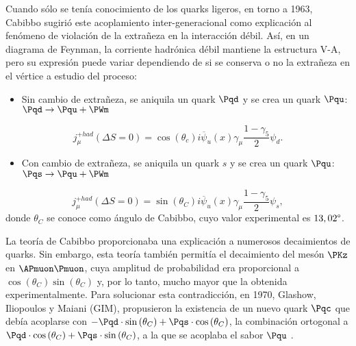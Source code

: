 Cuando sólo se tenía conocimiento de los quarks ligeros, en torno a 1963, Cabibbo sugirió este acoplamiento inter-generacional como explicación al fenómeno de violación de la extrañeza en la interacción débil. Así, en un diagrama de Feynman, la corriente hadrónica débil mantiene la estructura V-A, pero su expresión puede variar dependiendo de si se conserva o no la extrañeza en el vértice a estudio del proceso:
\begin{itemize}
\item Sin cambio de extrañeza, se aniquila un quark $\Pqd$ y se crea un quark $\Pqu$: $\Pqd \rightarrow \Pqu + \PWm$
\end{itemize}
\begin{equation}
j_{\mu}^{+had}(\Delta S= 0)=\cos \left( \theta _{c}\right) i\overline{\psi }_{u}\left( x\right) \gamma _{\mu }\dfrac{1-\gamma _{5}}{2}\psi _{d} .
\end{equation}
\begin{itemize}
\item Con cambio de extrañeza, se aniquila un quark $s$ y se crea un quark $\Pqu$: $\Pqs \rightarrow \Pqu + \PWm$
\end{itemize}
\begin{equation}
j_{\mu}^{+had}(\Delta S= 0)=\sin \left( \theta _{C}\right) i\overline{\psi }_{u}\left( x\right) \gamma _{\mu }\dfrac{1-\gamma _{5}}{2}\psi _{s} ,
\end{equation}
donde $\theta_{C}$ se conoce como ángulo de Cabibbo, cuyo valor experimental es $13,02\degree$.

La teoría de Cabibbo proporcionaba una explicación a numerosos decaimientos de quarks. Sin embargo, esta teoría también permitía el decaimiento del mesón $\PKz$ en $\APmuon\Pmuon$, cuya amplitud de probabilidad era proporcional a $\cos \left( \theta _{C}\right) \sin \left( \theta _{C}\right)$ y, por lo tanto, mucho mayor que la obtenida experimentalmente.  Para solucionar esta contradicción, en 1970, Glashow, Iliopoulos y Maiani (GIM), propusieron la existencia de un nuevo quark $\Pqc$ que debía acoplarse con $-\Pqd \cdot \sin \left( \theta _{C}\right) + \Pqs \cdot \cos \left( \theta_C \right)$, la combinación ortogonal a $\Pqd \cdot \cos \left( \theta _{C}\right) + \Pqs \cdot \sin \left( \theta _{C}\right)$, a la que se acoplaba el sabor $\Pqu$ \cite{Griffiths2008}.

